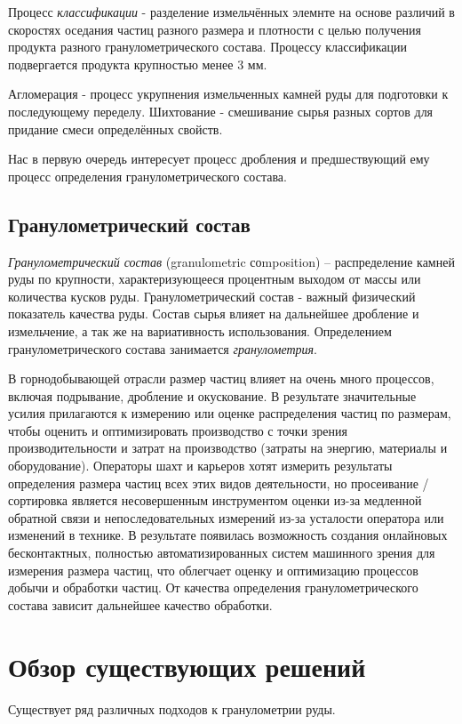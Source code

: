 \documentclass[specification,annotation,times]{itmo-student-thesis}
\begin{document}
Процесс \textit{классификации} - разделение измельчённых элемнте на основе различий в скоростях оседания частиц разного размера и плотности с целью получения продукта разного гранулометрического состава. Процессу классификации подвергается продукта крупностью менее 3 мм.

Агломерация - процесс укрупнения измельченных камней руды для подготовки к последующему переделу. Шихтование - смешивание сырья разных сортов для придание смеси определённых свойств.

Нас в первую очередь интересует процесс дробления и предшествующий ему процесс определения гранулометрического состава.
\subsection{Гранулометрический состав}
\textit{Гранулометрический состав} (granulometric соmposition) -- распределение камней руды по крупности, характеризующееся процентным выходом от массы или количества кусков руды. 
Гранулометрический состав - важный физический показатель качества руды.  Состав сырья влияет на дальнейшее дробление и измельчение, а так же на вариативность использования. Определением гранулометрического состава занимается \textit{гранулометрия}.

В горнодобывающей отрасли размер частиц влияет на очень  много процессов, включая подрывание, дробление и окускование. В результате значительные усилия прилагаются к измерению или оценке распределения частиц по размерам, чтобы оценить и оптимизировать производство с точки зрения производительности и затрат на производство (затраты на энергию, материалы и оборудование). Операторы шахт и карьеров хотят измерить результаты определения размера частиц всех этих видов деятельности, но просеивание / сортировка является несовершенным инструментом оценки из-за медленной обратной связи и непоследовательных измерений из-за усталости оператора или изменений в технике. В результате появилась возможность создания онлайновых бесконтактных, полностью автоматизированных систем машинного зрения для измерения размера частиц, что облегчает оценку и оптимизацию процессов добычи и обработки частиц.
От качества определения гранулометрического состава зависит дальнейшее качество обработки.


\section{Обзор существующих решений}
Существует ряд различных подходов к гранулометрии руды. 
\end{document}

